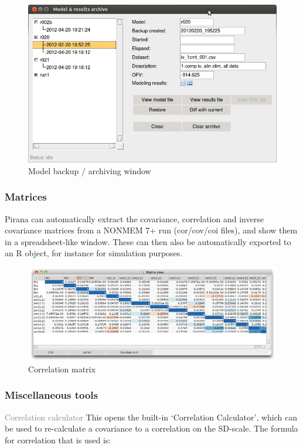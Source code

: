 {{{{\begin{figure}[H] \centering
    \includegraphics[scale=0.35]{images/modelbackup.png}
    \caption{Model backup / archiving window}
\end{figure}

\subsubsection*{Matrices}
Pirana can automatically extract the covariance, correlation and
inverse covariance matrices from a NONMEM 7+ run (cor/cov/coi files),
and show them in a spreadsheet-like window. These can then also be
automatically exported to an R object, for instance for simulation
purposes.

\begin{figure}[H] \centering
    \includegraphics[scale=0.28]{images/cor.png}
    \caption{Correlation matrix}
\end{figure}

\subsubsection*{Miscellaneous tools}

\begin {description}
  \item{\textcolor{Grey}{Correlation calculator}} This opens the
built-in `Correlation Calculator', which can be used to re-calculate a
covariance to a correlation on the SD-scale. The formula for
correlation that is used is:


\end{description}}}}}
